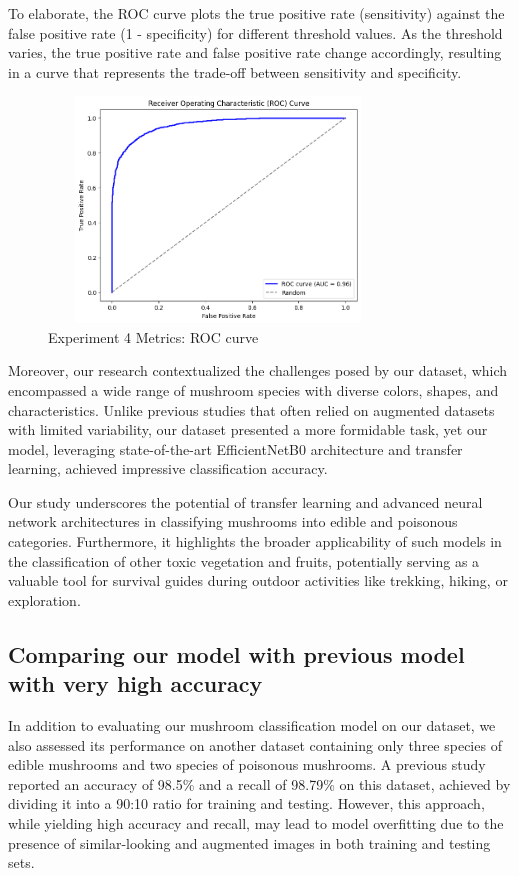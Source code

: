 To elaborate, the ROC curve plots the true positive rate (sensitivity) against the false positive rate (1 - specificity) for different threshold values. As the threshold varies, the true positive rate and false positive rate change accordingly, resulting in a curve that represents the trade-off between sensitivity and specificity.

\begin{figure}[!ht]
    \centering
    \includegraphics[height=6cm, width=9cm]{images/4.roc.png}
    \caption{Experiment 4 Metrics: ROC curve}
\end{figure}





Moreover, our research contextualized the challenges posed by our dataset, which encompassed a wide range of mushroom species with diverse colors, shapes, and characteristics. Unlike previous studies that often relied on augmented datasets with limited variability, our dataset presented a more formidable task, yet our model, leveraging state-of-the-art EfficientNetB0 architecture and transfer learning, achieved impressive classification accuracy.

Our study underscores the potential of transfer learning and advanced neural network architectures in classifying mushrooms into edible and poisonous categories. Furthermore, it highlights the broader applicability of such models in the classification of other toxic vegetation and fruits, potentially serving as a valuable tool for survival guides during outdoor activities like trekking, hiking, or exploration.

\subsection{Comparing our model with previous model with very high accuracy}
In addition to evaluating our mushroom classification model on our dataset, we also assessed its performance on another dataset containing only three species of edible mushrooms and two species of poisonous mushrooms. A previous study reported an accuracy of 98.5\% and a recall of 98.79\% on this dataset, achieved by dividing it into a 90:10 ratio for training and testing. However, this approach, while yielding high accuracy and recall, may lead to model overfitting due to the presence of similar-looking and augmented images in both training and testing sets.

